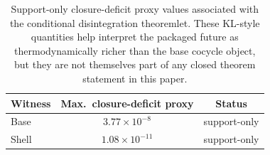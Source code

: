 \begin{table}[t]
\caption{Support-only closure-deficit proxy values associated with the conditional
disintegration theoremlet.
These KL-style quantities help interpret the packaged future as
thermodynamically richer than the base cocycle object, but they are
not themselves part of any closed theorem statement in this paper.}
\label{tbl:closure-deficit-proxy}
\centering
\small
\begin{tabular}{@{}l c c@{}}
\toprule
Witness & Max.\ closure-deficit proxy & Status \\
\midrule
Base  & $3.77\times 10^{-8}$  & support-only \\
Shell & $1.08\times 10^{-11}$ & support-only \\
\bottomrule
\end{tabular}
\end{table}

